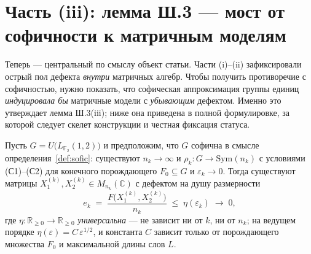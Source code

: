 \documentclass[11pt,a4paper]{article}
\theoremstyle{plain}
\theoremstyle{definition}
\theoremstyle{remark}
\begin{document}
\section{Часть (iii): лемма Ш.3 — мост от софичности к матричным моделям}
\label{sec:part3}

Теперь — центральный по смыслу объект статьи. Части (i)--(ii)
зафиксировали острый пол дефекта \emph{внутри} матричных алгебр. Чтобы
получить противоречие с софичностью, нужно показать, что софическая
аппроксимация группы единиц \emph{индуцировала бы} матричные модели с
\emph{убывающим} дефектом. Именно это утверждает лемма Ш.3(iii); ниже
она приведена в полной формулировке, за которой следует скелет
конструкции и честная фиксация статуса.

\begin{lemmabox}
Пусть $G=U\bigl(L_{\mathbb{F}_2}(1,2)\bigr)$ и предположим, что $G$
софична в смысле определения~\ref{def:sofic}: существуют $n_k\to\infty$
и $\rho_k\colon G\to\mathrm{Sym}(n_k)$ с условиями (С1)--(С2) для
конечного порождающего $F_0\subseteq G$ и $\varepsilon_k\to 0$. Тогда
существуют матрицы $X_1^{(k)},X_2^{(k)}\in M_{n_k}(\mathbb{C})$ с
дефектом на душу размерности
\[
e_k \;=\; \frac{F\bigl(X_1^{(k)},X_2^{(k)}\bigr)}{n_k}
\;\le\; \eta(\varepsilon_k)\;\longrightarrow\;0,
\]
где $\eta\colon\mathbb{R}_{\ge0}\to\mathbb{R}_{\ge0}$ \emph{универсальна}
— не зависит ни от $k$, ни от $n_k$; на ведущем порядке
$\eta(\varepsilon)=C\,\varepsilon^{1/2}$, и константа $C$ зависит только
от порождающего множества $F_0$ и максимальной длины слов $L$.
\end{lemmabox}
\end{document}
